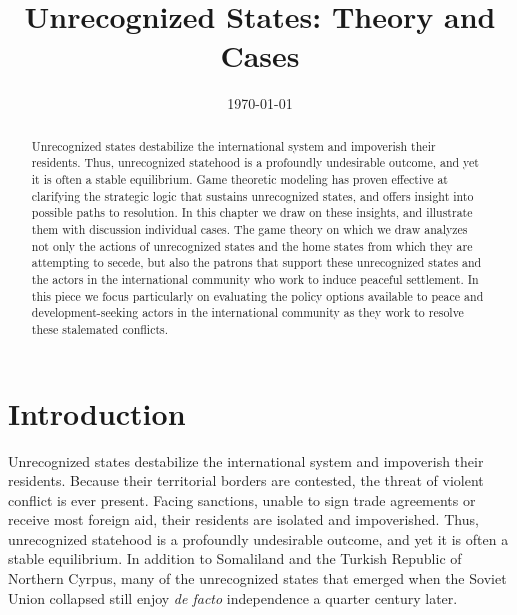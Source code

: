 \documentclass[12pt,letterpaper, notitlepage]{article}
\title{Unrecognized States:  Theory and Cases}
\date{\today}
\begin{document}
\begin{titlepage}
\maketitle
\thispagestyle{empty}

\begin{abstract}
\noindent  Unrecognized states destabilize the international system and impoverish their residents. Thus, unrecognized statehood is a profoundly undesirable outcome, and yet it is often a  stable equilibrium. Game theoretic modeling has proven effective at clarifying the strategic logic that sustains unrecognized states, and offers insight into possible paths to resolution. In this chapter we draw on these insights, and illustrate them with discussion individual cases. The game theory on which we draw analyzes not only the actions of unrecognized states and the home states from which they are attempting to secede, but also the patrons that support these unrecognized states and the actors in the international community who work to induce peaceful settlement. In this piece we focus particularly on evaluating the policy options available to peace and development-seeking actors in the international community as they work to resolve these stalemated conflicts.
\end{abstract}

\end{titlepage}
\setcounter{page}{1}

\doublespacing


\section*{Introduction}

Unrecognized states destabilize the international system and impoverish their residents. Because their territorial borders are contested, the threat of violent conflict is ever present. Facing sanctions, unable to sign trade agreements or receive most foreign aid, their residents are isolated and impoverished. Thus, unrecognized statehood is a profoundly undesirable outcome, and yet it is often a  stable equilibrium. In addition to Somaliland and the Turkish Republic of Northern Cyrpus, many of the unrecognized states that emerged when the Soviet Union collapsed still enjoy \emph{de facto} independence a quarter century later.
\end{document}
